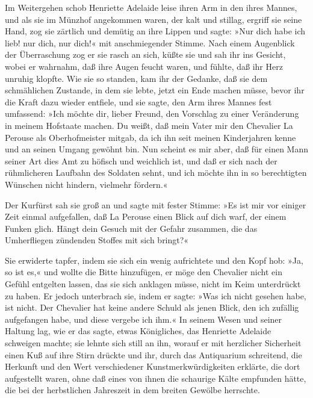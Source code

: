 Im Weitergehen schob Henriette Adelaide leise ihren Arm in den
ihres Mannes, und als sie im Münzhof angekommen waren, der kalt und
stillag, ergriff sie seine Hand, zog sie zärtlich und demütig an
ihre Lippen und sagte: »Nur dich habe ich lieb! nur dich, nur
dich!« mit anschmiegender Stimme. Nach einem Augenblick der
Überraschung zog er sie rasch an sich, küßte sie und sah ihr ins
Gesicht, wobei er wahrnahm, daß ihre Augen feucht waren, und
fühlte, daß ihr Herz unruhig klopfte. Wie sie so standen, kam ihr
der Gedanke, daß sie dem schmählichen Zustande, in dem sie lebte,
jetzt ein Ende machen müsse, bevor ihr die Kraft dazu wieder
entfiele, und sie sagte, den Arm ihres Mannes fest umfassend: »Ich
möchte dir, lieber Freund, den Vorschlag zu einer Veränderung in
meinem Hofstaate machen. Du weißt, daß mein Vater mir den
\pagenum{[119]}Chevalier La Perouse als Oberhofmeister mitgab, da
ich ihn seit meinen Kinderjahren kenne und an seinen Umgang gewöhnt
bin. Nun scheint es mir aber, daß für einen Mann seiner Art dies
Amt zu höfisch und weichlich ist, und daß er sich nach der
rühmlicheren Laufbahn des Soldaten sehnt, und ich möchte ihn in so
berechtigten Wünschen nicht hindern, vielmehr fördern.«

Der Kurfürst sah sie groß an und sagte mit fester Stimme: »Es ist
mir vor einiger Zeit einmal aufgefallen, daß La Perouse einen Blick
auf dich warf, der einem Funken glich. Hängt dein Gesuch mit der
Gefahr zusammen, die das Umherfliegen zündenden Stoffes mit sich
bringt?«

Sie erwiderte tapfer, indem sie sich ein wenig aufrichtete und den
Kopf hob: »Ja, so ist es,« und wollte die Bitte hinzufügen, er möge
den Chevalier nicht ein Gefühl entgelten lassen, das sie sich
anklagen müsse, nicht im Keim unterdrückt zu haben. Er jedoch
unterbrach sie, indem er sagte: »Was ich nicht gesehen habe, ist
nicht. Der Chevalier hat keine andere Schuld als jenen Blick, den
ich zufällig aufgefangen habe, und diese vergebe ich ihm.« In
seinem Wesen und seiner Haltung lag, wie er das sagte, etwas
Königliches, das Henriette Adelaide schweigen machte; sie lehnte
sich still an ihn, worauf er mit herzlicher Sicherheit einen Kuß
auf ihre Stirn drückte und ihr, durch das Antiquarium schreitend,
die Herkunft und den Wert verschiedener Kunstmerkwürdigkeiten
erklärte, die dort aufgestellt waren, ohne daß eines von ihnen die
schaurige Kälte empfunden hätte, die bei der herbstlichen
Jahreszeit in dem breiten Gewölbe herrschte.


